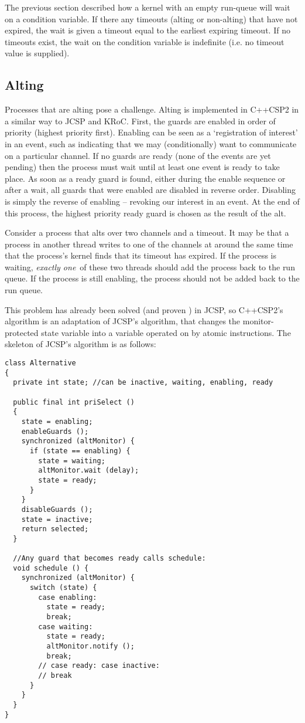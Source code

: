 \documentclass[12pt]{IOS-Book-Article-CPA-2007}
\begin{document}
The previous section described how a kernel with an empty run-queue will wait on a condition variable.  If there any timeouts (alting or non-alting) 
that have not expired, the wait is given a timeout equal to the earliest expiring timeout.  If no timeouts exist, the wait on the condition variable
is indefinite (i.e. no timeout value is supplied).

\subsection{Alting}
\label{sec-alting}

Processes that are alting pose a challenge.  Alting is implemented in C++CSP2 in a similar way to JCSP and KRoC.  First, the guards are enabled in 
order of priority (highest priority first).  Enabling can be seen as a `registration of interest' in an event, such as indicating that we may 
(conditionally) want to communicate on a particular channel.  If no guards are ready (none of the events are yet pending) then the process must wait until at least one event is ready to take 
place.  As soon as a ready guard is found, either during the enable sequence or after a wait, all guards that were enabled are disabled in reverse 
order.  Disabling is simply the reverse of enabling -- revoking our interest in an event.  At the end of this process, the highest priority
ready guard is chosen as the result of the alt.

Consider a process that alts over two channels and a timeout.
It may be that a process in another thread writes to one of the channels at around the same time that the process's kernel finds that its timeout
has expired.  If the process is waiting, \textit{exactly one}~of these two threads should add the process back to the run queue.  If the process 
is still enabling, the process should not be added back to the run queue.

This problem has already been solved (and proven \cite{welch-formal-00}) in JCSP, so C++CSP2's algorithm is an adaptation of JCSP's algorithm, that changes the monitor-protected
state variable into a variable operated on by atomic instructions.  The skeleton of JCSP's algorithm is as follows:

{\small\begin{verbatim}
class Alternative
{
  private int state; //can be inactive, waiting, enabling, ready
  
  public final int priSelect () 
  {
    state = enabling;
    enableGuards ();
    synchronized (altMonitor) {
      if (state == enabling) {
        state = waiting;
        altMonitor.wait (delay);
        state = ready;
      }
    }
    disableGuards ();
    state = inactive;
    return selected;
  }

  //Any guard that becomes ready calls schedule:
  void schedule () {
    synchronized (altMonitor) {
      switch (state) {
        case enabling:
          state = ready;
          break;
        case waiting:
          state = ready;
          altMonitor.notify ();
          break;
        // case ready: case inactive:
        // break
      }
    }
  }
}
\end{verbatim}}
\end{document}

